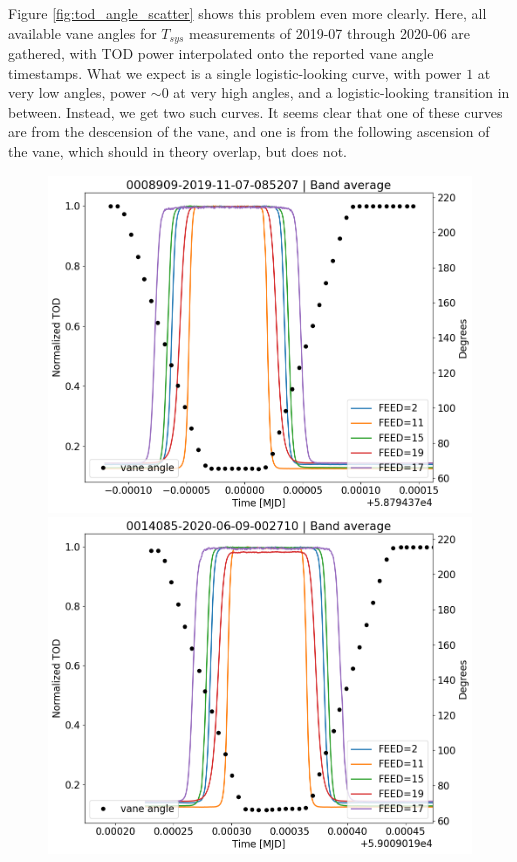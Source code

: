 \documentclass[10pt, a4paper]{article}
\begin{document}
Figure \ref{fig:tod_angle_scatter} shows this problem even more clearly. Here, all available vane angles for $T_{sys}$ measurements of 2019-07 through 2020-06 are gathered, with TOD power interpolated onto the reported vane angle timestamps. What we expect is a single logistic-looking curve, with power $1$ at very low angles, power $\sim 0$ at very high angles, and a logistic-looking transition in between. Instead, we get two such curves. It seems clear that one of these curves are from the descension of the vane, and one is from the following ascension of the vane, which should in theory overlap, but does not.

\begin{figure}[H]
    \centering
    \includegraphics[scale=0.34]{../plots/tod_angle_0008909-2019-11-07-085207.png}
    \includegraphics[scale=0.34]{../plots/tod_angle_0014085-2020-06-09-002710.png}

\end{figure}
\end{document}
